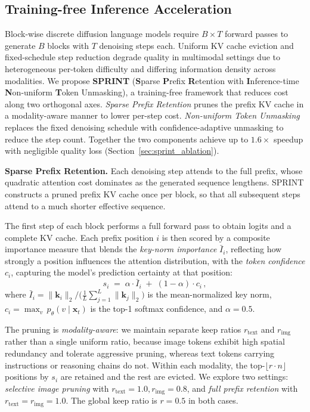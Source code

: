 \subsection{Training-free Inference Acceleration}
\label{sec:sprint}

Block-wise discrete diffusion language models require $B \times T$ forward passes to generate $B$ blocks with $T$ denoising steps each. Uniform KV cache eviction and fixed-schedule step reduction degrade quality in multimodal settings due to heterogeneous per-token difficulty and differing information density across modalities. We propose \textbf{SPRINT} (\textbf{S}parse \textbf{P}refix \textbf{R}etention with \textbf{I}nference-time \textbf{N}on-uniform \textbf{T}oken Unmasking), a training-free framework that reduces cost along two orthogonal axes. \emph{Sparse Prefix Retention} prunes the prefix KV cache in a modality-aware manner to lower per-step cost. \emph{Non-uniform Token Unmasking} replaces the fixed denoising schedule with confidence-adaptive unmasking to reduce the step count. Together the two components achieve up to $1.6\times$ speedup with negligible quality loss (Section~\ref{sec:sprint_ablation}).


\noindent
\textbf{Sparse Prefix Retention.}\label{sec:sprint_spr}
Each denoising step attends to the full prefix, whose quadratic attention cost dominates as the generated sequence lengthens.
SPRINT constructs a pruned prefix KV cache once per block, so that all subsequent steps attend to a much shorter effective sequence.

The first step of each block performs a full forward pass to obtain logits and a complete KV cache.
Each prefix position $i$ is then scored by a composite importance measure that blends the \emph{key-norm importance} $\bar{I}_i$, reflecting how strongly a position influences the attention distribution, with the \emph{token confidence} $c_i$, capturing the model's prediction certainty at that position:
\begin{equation}\label{eq:sprint_importance}
    s_i \;=\; \alpha \cdot \bar{I}_i \;+\; (1 - \alpha) \cdot c_i \,,
\end{equation}
where $\bar{I}_i = {\|\mathbf{k}_i\|_2}\big/\bigl({\frac{1}{L}\sum_{j=1}^{L}\|\mathbf{k}_j\|_2}\bigr)$ is the mean-normalized key norm, $c_i = \max_{v}\, p_\theta(v \mid \mathbf{x}_t)$ is the top-1 softmax confidence, and $\alpha = 0.5$.

The pruning is \emph{modality-aware}: we maintain separate keep ratios $r_{\text{text}}$ and $r_{\text{img}}$ rather than a single uniform ratio, because image tokens exhibit high spatial redundancy and tolerate aggressive pruning, whereas text tokens carrying instructions or reasoning chains do not.
Within each modality, the top-$\lfloor r \cdot n \rfloor$ positions by $s_i$ are retained and the rest are evicted.
We explore two settings: \emph{selective image pruning} with $r_{\text{text}} = 1.0, r_{\text{img}} = 0.8$, and \emph{full prefix retention} with $r_{\text{text}} = r_{\text{img}} = 1.0$.
The global keep ratio is $r = 0.5$ in both cases.


